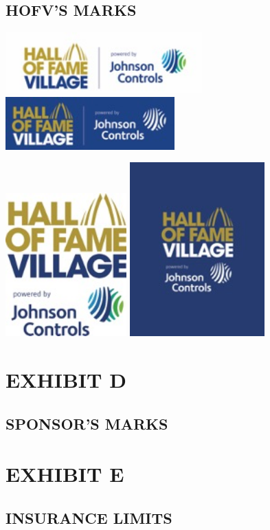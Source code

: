\documentclass[]{article}
\begin{document}
\hypertarget{hofvs-marks}{%
\subsection{HOFV'S MARKS}\label{hofvs-marks}}

\includegraphics[width=2.98958in,height=0.92708in]{../assets/hofvbannera.jpg}
\includegraphics[width=2.5625in,height=0.80208in]{../assets/hofvbannerb.jpg}

\includegraphics[width=1.83333in,height=2.16667in]{../assets/hofvpostera.jpg}
\includegraphics[width=2.04167in,height=2.63542in]{../assets/hofvposterb.jpg}

\hypertarget{exhibit-d}{%
\section{EXHIBIT D}\label{exhibit-d}}

\hypertarget{sponsors-marks}{%
\subsection{SPONSOR'S MARKS}\label{sponsors-marks}}

\emph{\textbf{\hfill\break
}}

\hypertarget{exhibit-e}{%
\section{EXHIBIT E}\label{exhibit-e}}

\hypertarget{insurance-limits}{%
\subsection{INSURANCE LIMITS}\label{insurance-limits}}
\end{document}
